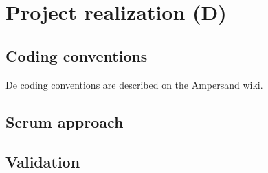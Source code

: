 \section{Project realization (D)}
\label{sec:project-realization}
%

\subsection{Coding conventions}
De coding conventions are described on the Ampersand wiki\cite{ampersand-wiki}.

\subsection{Scrum approach}
\lipsum[1]
\subsection{Validation}
\lipsum[1]